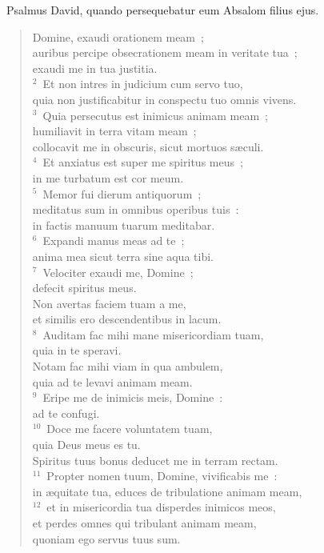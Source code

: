~\lettrine[lines=10,image=true,loversize=0.05,lraise=-0.03]{P}{}salmus David, quando persequebatur eum Absalom filius ejus. \begin{flushleft}\begin{verse}\vspace{6pt}Domine, exaudi orationem meam~;\\ auribus percipe obsecrationem meam in veritate tua~;\\ exaudi me in tua justitia.\\
${}^{2}$~Et non intres in judicium cum servo tuo,\\ quia non justificabitur in conspectu tuo omnis vivens.\\
${}^{3}$~Quia persecutus est inimicus animam meam~;\\ humiliavit in terra vitam meam~;\\ collocavit me in obscuris, sicut mortuos s\ae culi.\\
${}^{4}$~Et anxiatus est super me spiritus meus~;\\ in me turbatum est cor meum.\\
${}^{5}$~Memor fui dierum antiquorum~;\\ meditatus sum in omnibus operibus tuis~:\\ in factis manuum tuarum meditabar.\\
${}^{6}$~Expandi manus meas ad te~;\\ anima mea sicut terra sine aqua tibi.\\
${}^{7}$~Velociter exaudi me, Domine~;\\ defecit spiritus meus.\\ Non avertas faciem tuam a me,\\ et similis ero descendentibus in lacum.\\
${}^{8}$~Auditam fac mihi mane misericordiam tuam,\\ quia in te speravi.\\ Notam fac mihi viam in qua ambulem,\\ quia ad te levavi animam meam.\\
${}^{9}$~Eripe me de inimicis meis, Domine~:\\ ad te confugi.\\
${}^{10}$~Doce me facere voluntatem tuam,\\ quia Deus meus es tu.\\ Spiritus tuus bonus deducet me in terram rectam.\\
${}^{11}$~Propter nomen tuum, Domine, vivificabis me~:\\ in \ae quitate tua, educes de tribulatione animam meam,\\
${}^{12}$~et in misericordia tua disperdes inimicos meos,\\ et perdes omnes qui tribulant animam meam,\\ quoniam ego servus tuus sum.\end{verse}\end{flushleft}


